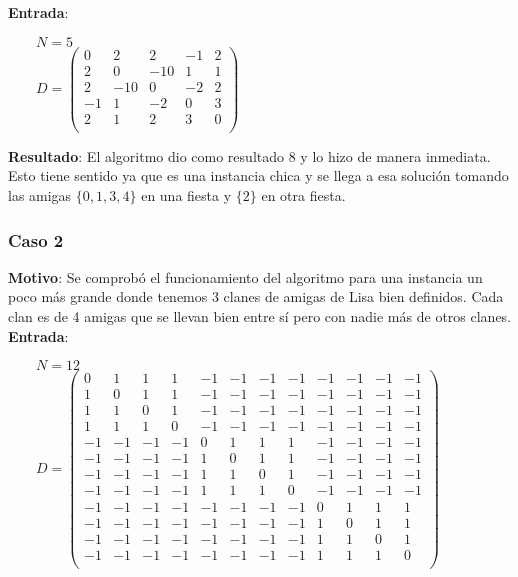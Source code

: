 \textbf{Entrada}:

\begin{flushleft}
$\qquad N = 5$\\[10pt]
$\qquad D = \left( \begin{smallmatrix}
0 & 2 & 2 & -1 & 2 \\
2 & 0 & -10 & 1 & 1 \\
2 & -10 & 0 & -2 & 2 \\
-1 & 1 & -2 & 0 & 3 \\
2 & 1 & 2 & 3 & 0 \\
\end{smallmatrix} \right)$
\end{flushleft}

\textbf{Resultado}: El algoritmo dio como resultado 8 y lo hizo de manera inmediata. Esto tiene sentido ya 
que es una instancia chica y se llega a esa solución tomando las amigas $\{ 0, 1, 3, 4 \}$ en una fiesta y $\{ 2 \}$ en otra fiesta.

\subsubsection*{Caso 2}

\textbf{Motivo}: Se comprobó el funcionamiento del algoritmo para una instancia un poco más grande donde tenemos 3 clanes de amigas de Lisa bien definidos. 
Cada clan es de 4 amigas que se llevan bien entre sí pero con nadie más de otros clanes. \\

\textbf{Entrada}:

\begin{flushleft}
$\qquad N = 12$\\[10pt]
$\qquad D = \left( \begin{smallmatrix}
0 & 1 & 1 & 1 & -1 & -1 & -1 & -1 & -1 & -1 & -1 & -1 \\
1 & 0 & 1 & 1 & -1 & -1 & -1 & -1 & -1 & -1 & -1 & -1 \\
1 & 1 & 0 & 1 & -1 & -1 & -1 & -1 & -1 & -1 & -1 & -1 \\
1 & 1 & 1 & 0 & -1 & -1 & -1 & -1 & -1 & -1 & -1 & -1 \\
-1 & -1 & -1 & -1 & 0 & 1 & 1 & 1 & -1 & -1 & -1 & -1 \\
-1 & -1 & -1 & -1 & 1 & 0 & 1 & 1 & -1 & -1 & -1 & -1 \\
-1 & -1 & -1 & -1 & 1 & 1 & 0 & 1 & -1 & -1 & -1 & -1 \\
-1 & -1 & -1 & -1 & 1 & 1 & 1 & 0 & -1 & -1 & -1 & -1 \\
-1 & -1 & -1 & -1 & -1 & -1 & -1 & -1 & 0 & 1 & 1 & 1 \\
-1 & -1 & -1 & -1 & -1 & -1 & -1 & -1 & 1 & 0 & 1 & 1 \\
-1 & -1 & -1 & -1 & -1 & -1 & -1 & -1 & 1 & 1 & 0 & 1 \\
-1 & -1 & -1 & -1 & -1 & -1 & -1 & -1 & 1 & 1 & 1 & 0 \\
\end{smallmatrix} \right)$
\end{flushleft}

